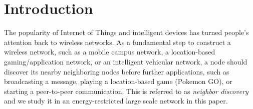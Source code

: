 \section{Introduction}








The popularity of Internet of Things and intelligent devices has turned people's attention back to wireless networks\cite{XX}. As a fundamental step to construct a wireless network, such as a mobile campus network, a location-based gaming/application network, or an intelligent vehicular network, a node should discover its nearby neighboring nodes before further applications, such as broadcasting a message, playing a location-based game (Pokemon GO), or starting a peer-to-peer communication. This is referred to as \emph{neighbor discovery} and we study it in an energy-restricted large scale network in this paper.

